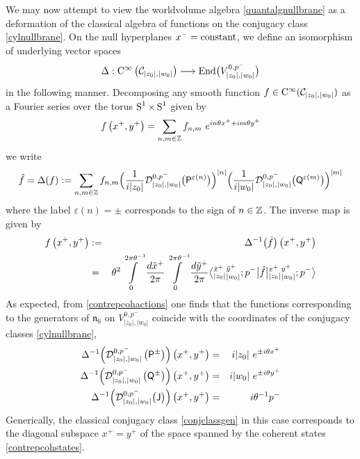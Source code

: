 We may now attempt to view the worldvolume algebra \eqref{quantalgnullbrane} as
a deformation of the classical algebra of functions on the conjugacy class
\eqref{cylnullbrane}. On the null hyperplanes $x^-={\rm constant}$, we define an
isomorphism of underlying vector spaces
\begin{equation}
  \label{Deltanullbranes}
  \Delta : {\rm C}^\infty\left(\mathcal{C}_{|z_0|,|w_0|}
  \right)\longrightarrow{\rm End}\bigl(V_{|z_0|,|w_0|}^{0,p^-}\bigr)
\end{equation}
in the following manner. Decomposing any smooth function $f\in{\rm
  C}^\infty(\mathcal{C}_{|z_0|,|w_0|})$ as a Fourier series over
the torus $\S^1\times\S^1$ given by
\begin{equation}
  \label{Fourierfnull}
  f\left(x^+,y^+\right)=\sum_{n,m\in\Z}f_{n,m}~ e^{ i n \theta x^+
    + i m \theta y^+}
\end{equation}
we write
\begin{equation}
  \label{hatfDeltanull}
  \hat f=\Delta(f):=\sum_{n,m\in\Z}f_{n,m}
  \Bigl(\frac1{ i|z_0|} \mathcal{D}^{0,p^-}_{|z_0|,|w_0|}
  \bigl(\P^{\varepsilon(n)}\bigr)\Bigr)^{|n|} \Bigl(
  \frac1{ i|w_0|} \mathcal{D}^{0,p^-}_{|z_0|,|w_0|}
  \bigl(\Q^{\varepsilon(m)}\bigr)\Bigr)^{|m|}
\end{equation}
where the label $\varepsilon(n)=\pm$ corresponds to the sign of
$n\in\Z$. The inverse map is given by
\begin{eqnarray}
  \label{invDeltanull}
  f\left(x^+,y^+\right)&:=&\Delta^{-1}\bigl(\hat f \bigr)\left(x^+,y^+
  \right)\\\nn
  &=&\theta^2 \int\limits_0^{2\pi \theta^{-1}}\frac{ d\tilde x^+}{2\pi}
  \int\limits_0^{2\pi \theta^{-1}}\frac{ d\tilde y^+}{2\pi}
  \bigl\langle {}^{\tilde x^+}_{|z_0|} {}^{\tilde y^+}_{|w_0|} 
  ; p^-\bigr|\hat f\bigl| {}^{x^+}_{|z_0|} {}^{y^+}_{|w_0|} ;
  p^-\bigr\rangle
\end{eqnarray}
As expected, from \eqref{contrepcohactions} one finds that the functions
corresponding to the generators of $\mathfrak{n}_6$ on $V_{|z_0|,|w_0|}^{0,p^-}$
coincide with the coordinates of the conjugacy classes \eqref{cylnullbrane},
\begin{eqnarray}
  \label{nullfnsgens}
  \Delta^{-1}\Bigl(\mathcal{D}^{0,p^-}_{|z_0|,|w_0|}\left(\P^\pm\right)
  \Bigr)\left(x^+,y^+\right)&=& i|z_0|~ e^{\pm i \theta x^+} \\\nn
  \Delta^{-1}\Bigl(\mathcal{D}^{0,p^-}_{|z_0|,|w_0|}\left(\Q^\pm\right)
  \Bigr)\left(x^+,y^+\right)&=& i|w_0|~ e^{\pm i \theta y^+} \\\nn
  \Delta^{-1}\Bigl(\mathcal{D}^{0,p^-}_{|z_0|,|w_0|}\bigl(\J \bigr)
  \Bigr)\left(x^+,y^+\right)&=& i\theta^{-1} p^-
\end{eqnarray}
Generically, the classical conjugacy class \eqref{conjclassgen} in this case
corresponds to the diagonal subspace $x^+=y^+$ of the space spanned by the
coherent states \eqref{contrepcohstates}.

